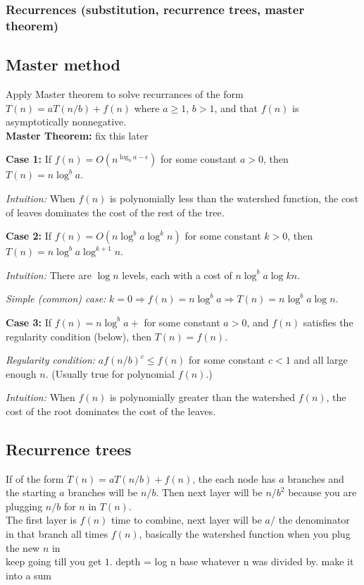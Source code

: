 \documentclass{article}
\begin{document}
        \subsubsection{Recurrences (substitution, recurrence trees, master theorem)}
        \subsection{Master method}
        Apply Master theorem to solve recurrances of the form $T(n) = aT(n/b) + f(n)$ where $a \geq 1$, $b > 1$, and that $f(n)$ is asymptotically nonnegative.\\
        \textbf{Master Theorem: }
        fix this later
        \begin{theorem}
            
            \textbf{Case 1:} If $f(n) = O(n^{\log_{b}a -\epsilon})$ for some constant $a > 0$, then $T(n) = n \log^b a$.

            \textit{Intuition:} When $f(n)$ is polynomially less than the watershed function, the cost of leaves dominates the cost of the rest of the tree.

            \textbf{Case 2:} If $f(n) = O(n \log^b a \log^k n)$ for some constant $k > 0$, then $T(n) = n \log^b a \log^{k+1} n$.

            \textit{Intuition:} There are $\log n$ levels, each with a cost of $n \log^b a \log kn$.

            \textit{Simple (common) case:} $k = 0 \Rightarrow f(n) = n \log^b a \Rightarrow T(n) = n \log^b a \log n$.

            \textbf{Case 3:} If $f(n) = n \log^b a +$ for some constant $a > 0$, and $f(n)$ satisfies the regularity condition (below), then $T(n) = f(n)$.

            \textit{Regularity condition:} $a f(n/b)^c \leq f(n)$ for some constant $c < 1$ and all large enough $n$. (Usually true for polynomial $f(n)$.)

            \textit{Intuition:} When $f(n)$ is polynomially greater than the watershed $f(n)$, the cost of the root dominates the cost of the leaves.

        \end{theorem}
        \subsection{Recurrence trees}
        If of the form $T(n) = aT(n/b) + f(n)$, the each node has $a$ branches and the starting $a$ branches will be $n/b$. Then next layer will be $n/b^2$ because you are plugging $n/b$ for $n$ in $T(n)$.\\
        The first layer is $f(n)$ time to combine, next layer will be $a/$ the denominator in that branch all times $f(n)$, basically the watershed function when you plug the new $n$ in\\
        keep going till you get $1$. depth = log n base whatever n was divided by. make it into a sum
        
\end{document}
